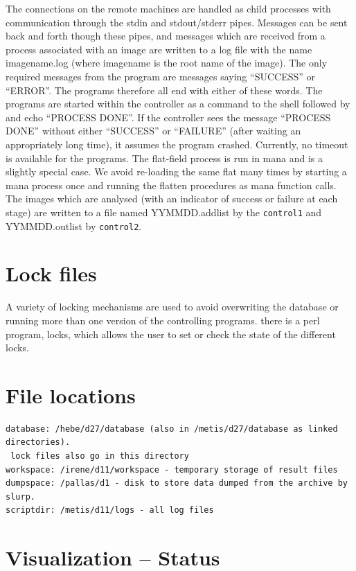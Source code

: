 \documentclass{article}
\begin{document}
The connections on the remote machines are handled as child processes
with communication through the stdin and stdout/stderr pipes.
Messages can be sent back and forth though these pipes, and messages
which are received from a process associated with an image are written
to a log file with the name imagename.log (where imagename is the root
name of the image).  The only required messages from the program are
messages saying ``SUCCESS'' or ``ERROR''.  The programs therefore all
end with either of these words.  The programs are started within the
controller as a command to the shell followed by and echo ``PROCESS
DONE''.  If the controller sees the message ``PROCESS DONE'' without
either ``SUCCESS'' or ``FAILURE'' (after waiting an appropriately long
time), it assumes the program crashed.  Currently, no timeout is
available for the programs.  The flat-field process is run in mana and
is a slightly special case.  We avoid re-loading the same flat many
times by starting a mana process once and running the flatten
procedures as mana function calls.  The images which are analysed
(with an indicator of success or failure at each stage) are written to
a file named YYMMDD.addlist by the {\tt control1} and YYMMDD.outlist
by {\tt control2}.

\section{Lock files}

A variety of locking mechanisms are used to avoid overwriting the
database or running more than one version of the controlling
programs.  there is a perl program, locks, which allows the user to
set or check the state of the different locks. 

\section{File locations}

\begin{verbatim}
database: /hebe/d27/database (also in /metis/d27/database as linked directories).
 lock files also go in this directory
workspace: /irene/d11/workspace - temporary storage of result files
dumpspace: /pallas/d1 - disk to store data dumped from the archive by slurp.
scriptdir: /metis/d11/logs - all log files
\end{verbatim}

\section{Visualization -- Status}
\end{document}
